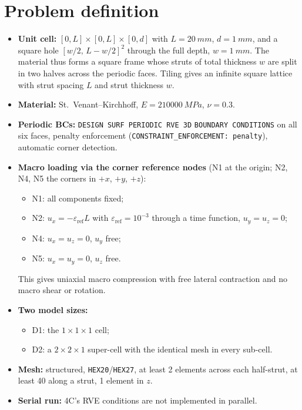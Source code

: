 \documentclass[11pt,a4paper]{report}
\begin{document}
\section{Problem definition}
\begin{itemize}
\item \textbf{Unit cell:} $[0,L]\times[0,L]\times[0,d]$ with $L=\SI{20}{mm}$,
  $d=\SI{1}{mm}$, and a square hole $[w/2,\,L-w/2]^2$ through the full depth,
  $w=\SI{1}{mm}$. The material thus forms a square frame whose struts of total
  thickness $w$ are split in two halves across the periodic faces. Tiling
  gives an infinite square lattice with strut spacing $L$ and strut
  thickness $w$.
\item \textbf{Material:} St.\ Venant--Kirchhoff, $E=\SI{210000}{MPa}$,
  $\nu=0.3$.
\item \textbf{Periodic BCs:} \texttt{DESIGN SURF PERIODIC RVE 3D} \texttt{BOUNDARY CONDITIONS} on all six faces, penalty enforcement
  (\texttt{CONSTRAINT\_ENFORCEMENT: penalty}), automatic corner detection.
\item \textbf{Macro loading via the corner reference nodes} (N1 at the
  origin; N2, N4, N5 the corners in $+x$, $+y$, $+z$):
  \begin{itemize}
  \item N1: all components fixed;
  \item N2: $u_x = -\varepsilon_\text{ref}L$ with $\varepsilon_\text{ref}=10^{-3}$
    through a time function, $u_y=u_z=0$;
  \item N4: $u_x=u_z=0$, $u_y$ free;
  \item N5: $u_x=u_y=0$, $u_z$ free.
  \end{itemize}
  This gives uniaxial macro compression with free lateral contraction and no
  macro shear or rotation.
\item \textbf{Two model sizes:}
  \begin{itemize}
  \item D1: the $1\times1\times1$ cell;
  \item D2: a $2\times2\times1$ super-cell with the identical mesh in every
    sub-cell.
  \end{itemize}
\item \textbf{Mesh:} structured, \texttt{HEX20}/\texttt{HEX27}, at least
  2 elements across each half-strut, at least 40 along a strut, 1 element in
  $z$.
\item \textbf{Serial run:} 4C's RVE conditions are not implemented in
  parallel.
\end{itemize}
\end{document}
